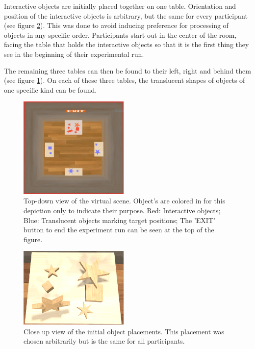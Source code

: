 Interactive objects are initially placed together on one table.
Orientation and position of the interactive objects is arbitrary, but the same for every participant (see figure \ref{figure_object_placement}).
This was done to avoid inducing preference for processing of objects in any specific order.
Participants start out in the center of the room, facing the table that holds the interactive objects so that it is the first thing they see in the beginning of their experimental run.

The remaining three tables can then be found to their left, right and behind them (see figure \ref{figure_experiment_layout}). On each of these three tables, the translucent shapes of objects of one specific kind can be found.

\begin{figure}
\includegraphics[width=0.48\textwidth]{figures/map_top_mipmap.PNG}
\caption{
\textsf{Top-down view of the virtual scene. Object's are colored in for this depiction only to indicate their purpose. Red: Interactive objects; Blue: Translucent objects marking target positions; The 'EXIT' button to end the experiment run can be seen at the top of the figure.}
}
\label{figure_experiment_layout}
\end{figure}
\begin{figure}
\includegraphics[width=0.48\textwidth]{figures/object_placement.PNG}
\caption{
\textsf{Close up view of the initial object placements. This placement was chosen arbitrarily but is the same for all participants.}
}
\label{figure_object_placement}
\end{figure}


